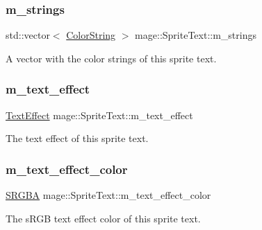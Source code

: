\subsubsection{\texorpdfstring{m\+\_\+strings}{m\_strings}}
{\footnotesize\ttfamily std\+::vector$<$ \hyperlink{classmage_1_1_color_string}{Color\+String} $>$ mage\+::\+Sprite\+Text\+::m\+\_\+strings\hspace{0.3cm}{\ttfamily [private]}}

A vector with the color strings of this sprite text. \hypertarget{classmage_1_1_sprite_text_a4019b7510bba20a9b86460fd6c47698f}{}\label{classmage_1_1_sprite_text_a4019b7510bba20a9b86460fd6c47698f} 
\subsubsection{\texorpdfstring{m\+\_\+text\+\_\+effect}{m\_text\_effect}}
{\footnotesize\ttfamily \hyperlink{classmage_1_1_sprite_text_a4d3101d037b6fe4247d77b5fbf811dd2}{Text\+Effect} mage\+::\+Sprite\+Text\+::m\+\_\+text\+\_\+effect\hspace{0.3cm}{\ttfamily [private]}}

The text effect of this sprite text. \hypertarget{classmage_1_1_sprite_text_a82f53e64dc8cc9a9d23a1c26ee9fad9e}{}\label{classmage_1_1_sprite_text_a82f53e64dc8cc9a9d23a1c26ee9fad9e} 
\subsubsection{\texorpdfstring{m\+\_\+text\+\_\+effect\+\_\+color}{m\_text\_effect\_color}}
{\footnotesize\ttfamily \hyperlink{structmage_1_1_s_r_g_b_a}{S\+R\+G\+BA} mage\+::\+Sprite\+Text\+::m\+\_\+text\+\_\+effect\+\_\+color\hspace{0.3cm}{\ttfamily [private]}}

The s\+R\+GB text effect color of this sprite text. 